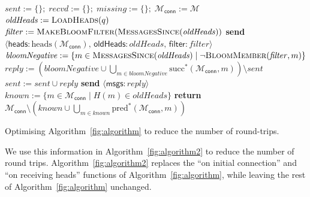 \documentclass[a4paper,anonymous,USenglish]{lipics-v2019}
\begin{document}
\begin{algorithm}[t]
    \begin{algorithmic}[1]
        \State $\mathit{sent} := \{\};\; \mathit{recvd} := \{\};\; \mathit{missing} := \{\};\; \mathcal{M}_\mathsf{conn} := \mathcal{M}$ 
        \State $\mathit{oldHeads} := \Call{LoadHeads}{q}$\label{line:load-heads}
        \State $\mathit{filter} := \textsc{MakeBloomFilter}(\Call{MessagesSince}{\mathit{oldHeads}})$\label{line:make-bloom}
        \State \textbf{send} $\langle\mathsf{heads}: \mathrm{heads}(\mathcal{M}_\mathsf{conn}),\, \mathsf{oldHeads}: \mathit{oldHeads},\, \mathsf{filter}: \mathit{filter}\rangle$ \label{line:a2-send-heads}
    \EndOn
    \State
    \label{line:a2-recv-heads}
        \State $\mathit{bloomNegative} := \{m \in \Call{MessagesSince}{\mathit{oldHeads}} \mid \neg\Call{BloomMember}{\mathit{filter}, m}\}$\label{line:bloom-member}
        \State $\mathit{reply} := \left(\mathit{bloomNegative} \cup \bigcup_{m \in \mathit{bloomNegative}} \mathrm{succ}^*(\mathcal{M}_\mathsf{conn}, m)\right) \setminus \mathit{sent}$\label{line:bloom-succ}
            \State $\mathit{sent} := \mathit{sent} \cup \mathit{reply}$
            \State \textbf{send} $\langle\mathsf{msgs}: \mathit{reply}\rangle$ \label{line:a2-heads-reply}
        \EndIf
        \State {} \label{line:a2-heads-missing}
    \EndOn
    \State
        \State $\mathit{known} := \{m \in \mathcal{M}_\mathsf{conn} \mid H(m) \in \mathit{oldHeads}\}$
        \State \textbf{return} $\mathcal{M}_\mathsf{conn} \setminus \left(\mathit{known} \cup \bigcup_{m \in \mathit{known}} \mathrm{pred}^*(\mathcal{M}_\mathsf{conn}, m)\right)$
    \EndFunction
    \end{algorithmic}
    \caption{Optimising Algorithm~\ref{fig:algorithm} to reduce the number of round-trips.}\label{fig:algorithm2}
\end{algorithm}

We use this information in Algorithm~\ref{fig:algorithm2} to reduce the number of round trips.
Algorithm~\ref{fig:algorithm2} replaces the ``on initial connection'' and ``on receiving heads'' functions of Algorithm~\ref{fig:algorithm}, while leaving the rest of Algorithm~\ref{fig:algorithm} unchanged.
\end{document}
